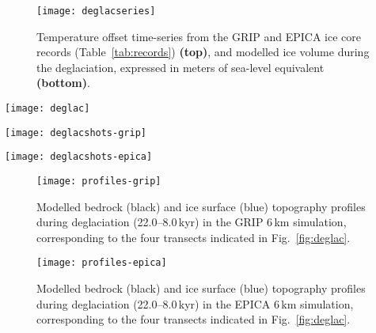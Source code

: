 \documentclass[tc, manuscript]{copernicus}
\begin{document}
\begin{figure}
  \texttt{[image: deglacseries]}
  \caption{Temperature offset time-series from the GRIP and EPICA ice core
           records (Table~\ref{tab:records}) \textbf{(top)}, and modelled ice
           volume during the deglaciation, expressed in meters of sea-level
           equivalent \textbf{(bottom)}.}
  \label{fig:deglacseries}
\end{figure}

\begin{figure*}
  \texttt{[image: deglac]}
  \caption{Modelled age of the last deglaciation. Areas where the MIS~4 glacial
           advance exceeded the last glacial maximum advanced are marked in
           green. Hatches denote re-advance of mountain-centred ice caps and
           and the decaying ice sheet between 14 and 10\,kyr., which is more
           pronounced in the GRIP-driven simulation.}
  \label{fig:deglac}
\end{figure*}

\begin{figure*}
  \texttt{[image: deglacshots-grip]}
  \caption{Snapshots of modelled surface topography (200\,m contours)
           and surface velocity (colour mapping) from the GRIP simulation,
           corresponding to the last glacial ice volume maximum (-19.1 kyr) and
           the last deglaciation.}
  \label{fig:deglacshots-grip}
\end{figure*}

\begin{figure*}
  \texttt{[image: deglacshots-epica]}
  \caption{Snapshots of modelled surface topography (200\,m contours)
           and surface velocity (colour mapping) from the EPICA simulation,
           corresponding to the last glacial ice volume maximum (-17.3 kyr) and
           the last deglaciation.}
  \label{fig:deglacshots-epica}
\end{figure*}


\begin{figure}
  \texttt{[image: profiles-grip]}
  \caption{Modelled bedrock (black) and ice surface (blue) topography profiles
           during deglaciation (22.0--8.0\,kyr) in the GRIP 6\,km
           simulation, corresponding to the four transects indicated in
           Fig.~\ref{fig:deglac}.}
  \label{fig:profiles-grip}
\end{figure}

\begin{figure}
  \texttt{[image: profiles-epica]}
  \caption{Modelled bedrock (black) and ice surface (blue) topography profiles
           during deglaciation (22.0--8.0\,kyr) in the EPICA 6\,km
           simulation, corresponding to the four transects indicated in
           Fig.~\ref{fig:deglac}.}
  \label{fig:profiles-epica}
\end{figure}
\end{document}
